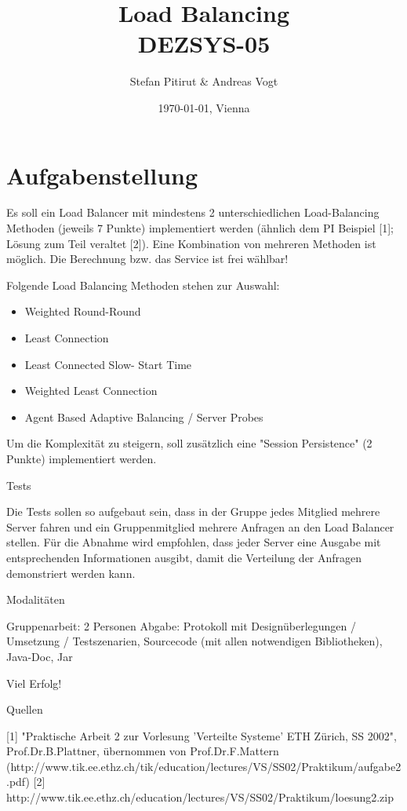 \documentclass[11pt,a4paper]{article}
\title{Load Balancing\\ DEZSYS-05}
\author{Stefan Pitirut \& Andreas Vogt}
\date{\today{}, Vienna}
\begin{document}
\maketitle

\newpage
\tableofcontents

\newpage
\section{Aufgabenstellung}
Es soll ein Load Balancer mit mindestens 2 unterschiedlichen Load-Balancing Methoden (jeweils 7 Punkte) implementiert werden (ähnlich dem PI Beispiel [1]; Lösung zum Teil veraltet [2]). Eine Kombination von mehreren Methoden ist möglich. Die Berechnung bzw. das Service ist frei wählbar!

Folgende Load Balancing Methoden stehen zur Auswahl:
\begin{itemize}
	\item Weighted Round-Round
	\item Least Connection
	\item Least Connected Slow- Start Time
	\item Weighted Least Connection
	\item Agent Based Adaptive Balancing / Server Probes
\end{itemize}

Um die Komplexität zu steigern, soll zusätzlich eine "Session Persistence" (2 Punkte) implementiert werden.

Tests

Die Tests sollen so aufgebaut sein, dass in der Gruppe jedes Mitglied mehrere Server fahren und ein Gruppenmitglied mehrere Anfragen an den Load Balancer stellen. Für die Abnahme wird empfohlen, dass jeder Server eine Ausgabe mit entsprechenden Informationen ausgibt, damit die Verteilung der Anfragen demonstriert werden kann.


Modalitäten

Gruppenarbeit: 2 Personen
Abgabe: Protokoll mit Designüberlegungen / Umsetzung / Testszenarien, Sourcecode (mit allen notwendigen Bibliotheken), Java-Doc, Jar


Viel Erfolg!


Quellen

[1] "Praktische Arbeit 2 zur Vorlesung 'Verteilte Systeme' ETH Zürich, SS 2002", Prof.Dr.B.Plattner, übernommen von Prof.Dr.F.Mattern (http://www.tik.ee.ethz.ch/tik/education/lectures/VS/SS02/Praktikum/aufgabe2.pdf)
[2] http://www.tik.ee.ethz.ch/education/lectures/VS/SS02/Praktikum/loesung2.zip
\end{document}
